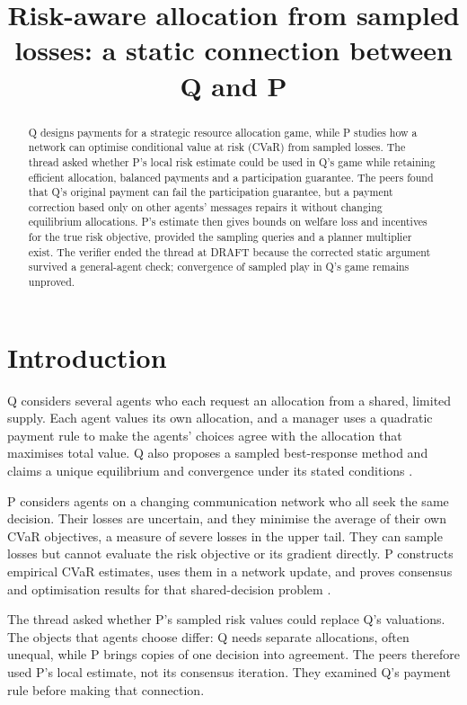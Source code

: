 \documentclass{article}
\title{Risk-aware allocation from sampled losses: a static connection between Q and P}
\begin{document}
\maketitle

\begin{abstract}
Q designs payments for a strategic resource allocation game, while P studies how a network can optimise conditional
value at risk (CVaR) from sampled losses. The thread asked whether P's local risk estimate could be used in Q's game
while retaining efficient allocation, balanced payments and a participation guarantee. The peers found that Q's
original payment can fail the participation guarantee, but a payment correction based only on other agents' messages
repairs it without changing equilibrium allocations. P's estimate then gives bounds on welfare loss and incentives for
the true risk objective, provided the sampling queries and a planner multiplier exist. The verifier ended the thread at
DRAFT because the corrected static argument survived a general-agent check; convergence of sampled play in Q's game
remains unproved.
\end{abstract}

\section{Introduction}

Q considers several agents who each request an allocation from a shared, limited supply. Each agent values its own
allocation, and a manager uses a quadratic payment rule to make the agents' choices agree with the allocation that
maximises total value. Q also proposes a sampled best-response method and claims a unique equilibrium and convergence
under its stated conditions \cite{Q}.

P considers agents on a changing communication network who all seek the same decision. Their losses are uncertain, and
they minimise the average of their own CVaR objectives, a measure of severe losses in the upper tail. They can sample
losses but cannot evaluate the risk objective or its gradient directly. P constructs empirical CVaR estimates, uses
them in a network update, and proves consensus and optimisation results for that shared-decision problem \cite{P}.

The thread asked whether P's sampled risk values could replace Q's valuations. The objects that agents choose differ: Q
needs separate allocations, often unequal, while P brings copies of one decision into agreement. The peers therefore
used P's local estimate, not its consensus iteration. They examined Q's payment rule before making that connection.
\end{document}

